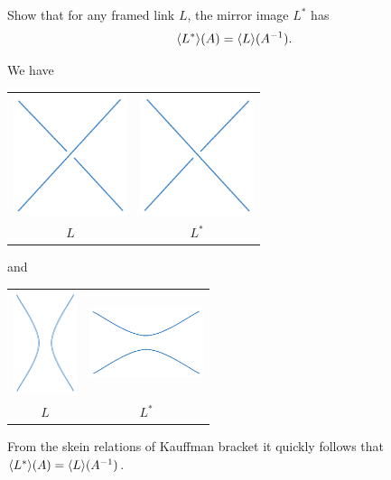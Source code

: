 \documentclass[10pt]{article}
\begin{document}
\begin{example}\label{b2e145}
	Show that for any framed link $L$, the mirror image $L^*$ has
	$$
	\langle L^*\rangle(A)=\langle L\rangle(A^{-1}).
	$$
\end{example}
\sol We have
\begin{center}
	\begin{tabular}{ c | c} 
		\includegraphics[width=9em]{figs/b2e145_1.png}&
		\includegraphics[width=9em]{figs/b2e145_2.png}\\
		$L$&$L^*$
	\end{tabular}
\end{center}
and
\begin{center}
	\begin{tabular}{ c | c} 
		\includegraphics[width=5em]{figs/b2e145_3.png}&
		\includegraphics[width=9em]{figs/b2e145_4.png}\\
		$L$&$L^*$
	\end{tabular}
\end{center}
From the skein relations of Kauffman bracket it quickly follows that $\langle L^*\rangle(A)=\langle L\rangle(A^{-1})$.
\end{document}
